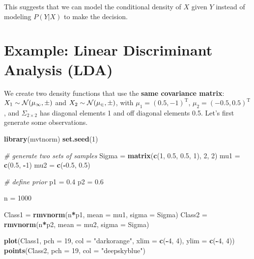\documentclass[
]{book}
\newenvironment{Shaded}{\begin{snugshade}}{\end{snugshade}}
\newcommand{\AttributeTok}[1]{\textcolor[rgb]{0.13,0.29,0.53}{#1}}
\newcommand{\CommentTok}[1]{\textcolor[rgb]{0.56,0.35,0.01}{\textit{#1}}}
\newcommand{\DecValTok}[1]{\textcolor[rgb]{0.00,0.00,0.81}{#1}}
\newcommand{\FloatTok}[1]{\textcolor[rgb]{0.00,0.00,0.81}{#1}}
\newcommand{\FunctionTok}[1]{\textcolor[rgb]{0.13,0.29,0.53}{\textbf{#1}}}
\newcommand{\NormalTok}[1]{#1}
\newcommand{\OtherTok}[1]{\textcolor[rgb]{0.56,0.35,0.01}{#1}}
\newcommand{\SpecialCharTok}[1]{\textcolor[rgb]{0.81,0.36,0.00}{\textbf{#1}}}
\newcommand{\StringTok}[1]{\textcolor[rgb]{0.31,0.60,0.02}{#1}}
\theoremstyle{definition}
\theoremstyle{definition}
\theoremstyle{definition}
\theoremstyle{definition}
\theoremstyle{remark}
\begin{document}
This suggests that we can model the conditional density of \(X\) given \(Y\) instead of modeling \(P(Y | X)\) to make the decision.

\hypertarget{example-linear-discriminant-analysis-lda}{%
\section{Example: Linear Discriminant Analysis (LDA)}\label{example-linear-discriminant-analysis-lda}}

We create two density functions that use the \textbf{same covariance matrix}: \(X_1 \sim \cal{N}(\mu_1, \Sigma)\) and \(X_2 \sim \cal{N}(\mu_2, \Sigma)\), with \(\mu_1 = (0.5, -1)^\text{T}\), \(\mu_2 = (-0.5, 0.5)^\text{T}\), and \(\Sigma_{2\times2}\) has diagonal elements 1 and off diagonal elements 0.5. Let's first generate some observations.

\begin{Shaded}
\begin{Highlighting}[]
  \FunctionTok{library}\NormalTok{(mvtnorm)}
  \FunctionTok{set.seed}\NormalTok{(}\DecValTok{1}\NormalTok{)}
  
  \CommentTok{\# generate two sets of samples}
\NormalTok{  Sigma }\OtherTok{=} \FunctionTok{matrix}\NormalTok{(}\FunctionTok{c}\NormalTok{(}\DecValTok{1}\NormalTok{, }\FloatTok{0.5}\NormalTok{, }\FloatTok{0.5}\NormalTok{, }\DecValTok{1}\NormalTok{), }\DecValTok{2}\NormalTok{, }\DecValTok{2}\NormalTok{)}
\NormalTok{  mu1 }\OtherTok{=} \FunctionTok{c}\NormalTok{(}\FloatTok{0.5}\NormalTok{, }\SpecialCharTok{{-}}\DecValTok{1}\NormalTok{)}
\NormalTok{  mu2 }\OtherTok{=} \FunctionTok{c}\NormalTok{(}\SpecialCharTok{{-}}\FloatTok{0.5}\NormalTok{, }\FloatTok{0.5}\NormalTok{)}
  
  \CommentTok{\# define prior}
\NormalTok{  p1 }\OtherTok{=} \FloatTok{0.4} 
\NormalTok{  p2 }\OtherTok{=} \FloatTok{0.6}
    
\NormalTok{  n }\OtherTok{=} \DecValTok{1000}
  
\NormalTok{  Class1 }\OtherTok{=} \FunctionTok{rmvnorm}\NormalTok{(n}\SpecialCharTok{*}\NormalTok{p1, }\AttributeTok{mean =}\NormalTok{ mu1, }\AttributeTok{sigma =}\NormalTok{ Sigma)}
\NormalTok{  Class2 }\OtherTok{=} \FunctionTok{rmvnorm}\NormalTok{(n}\SpecialCharTok{*}\NormalTok{p2, }\AttributeTok{mean =}\NormalTok{ mu2, }\AttributeTok{sigma =}\NormalTok{ Sigma)}

  \FunctionTok{plot}\NormalTok{(Class1, }\AttributeTok{pch =} \DecValTok{19}\NormalTok{, }\AttributeTok{col =} \StringTok{"darkorange"}\NormalTok{, }\AttributeTok{xlim =} \FunctionTok{c}\NormalTok{(}\SpecialCharTok{{-}}\DecValTok{4}\NormalTok{, }\DecValTok{4}\NormalTok{), }\AttributeTok{ylim =} \FunctionTok{c}\NormalTok{(}\SpecialCharTok{{-}}\DecValTok{4}\NormalTok{, }\DecValTok{4}\NormalTok{))}
  \FunctionTok{points}\NormalTok{(Class2, }\AttributeTok{pch =} \DecValTok{19}\NormalTok{, }\AttributeTok{col =} \StringTok{"deepskyblue"}\NormalTok{)}
\end{Highlighting}
\end{Shaded}
\end{document}
